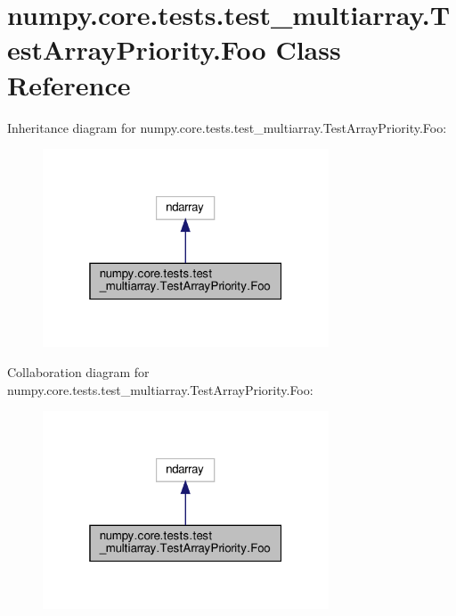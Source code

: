 \hypertarget{classnumpy_1_1core_1_1tests_1_1test__multiarray_1_1TestArrayPriority_1_1Foo}{}\section{numpy.\+core.\+tests.\+test\+\_\+multiarray.\+Test\+Array\+Priority.\+Foo Class Reference}
\label{classnumpy_1_1core_1_1tests_1_1test__multiarray_1_1TestArrayPriority_1_1Foo}


Inheritance diagram for numpy.\+core.\+tests.\+test\+\_\+multiarray.\+Test\+Array\+Priority.\+Foo\+:
\nopagebreak
\begin{figure}[H]
\begin{center}
\leavevmode
\includegraphics[width=241pt]{classnumpy_1_1core_1_1tests_1_1test__multiarray_1_1TestArrayPriority_1_1Foo__inherit__graph}
\end{center}
\end{figure}


Collaboration diagram for numpy.\+core.\+tests.\+test\+\_\+multiarray.\+Test\+Array\+Priority.\+Foo\+:
\nopagebreak
\begin{figure}[H]
\begin{center}
\leavevmode
\includegraphics[width=241pt]{classnumpy_1_1core_1_1tests_1_1test__multiarray_1_1TestArrayPriority_1_1Foo__coll__graph}
\end{center}
\end{figure}
